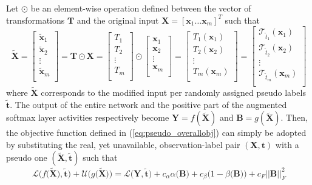 \documentclass{article} \usepackage{iclr2018_conference,times}
\begin{document}
Let $\odot$ be an element-wise operation defined between the vector of transformations $\boldsymbol{T}$ and the original input $\boldsymbol{X}=[\boldsymbol{x}_1 \dots \boldsymbol{x}_m]^T$ such that
\begin{equation}
\boldsymbol{\tilde{X}} = 
\begin{bmatrix}
\boldsymbol{\tilde{x}}_{1} \\ \boldsymbol{\tilde{x}}_{2} \\ \vdots \\ \boldsymbol{\tilde{x}}_m \\
\end{bmatrix} 
=
\boldsymbol{T} \odot \boldsymbol{X} = 
\begin{bmatrix}
T_{1} \\ T_{2} \\ \vdots \\ T_m \\
\end{bmatrix}
\odot
\begin{bmatrix}
\boldsymbol{x}_{1} \\ \boldsymbol{x}_{2} \\ \vdots \\ \boldsymbol{x}_m \\
\end{bmatrix} 
=
\begin{bmatrix}
T_{1}(\boldsymbol{x}_{1}) \\ T_{2}(\boldsymbol{x}_{2}) \\ \vdots \\ T_{m}(\boldsymbol{x}_m) \\
\end{bmatrix}
=
\begin{bmatrix}
\mathcal{T}_{\tilde{t}_1}(\boldsymbol{x}_{1}) \\ \mathcal{T}_{\tilde{t}_2}(\boldsymbol{x}_{2}) \\ \vdots \\ \mathcal{T}_{\tilde{t}_m}(\boldsymbol{x}_m) \\
\end{bmatrix} 
\end{equation}
where $\boldsymbol{\tilde{X}}$ corresponds to the modified input per randomly assigned pseudo labels $\boldsymbol{\tilde{t}}$. The output of the entire network and the positive part of the augmented softmax layer activities respectively become $\boldsymbol{Y} = f(\boldsymbol{\tilde{X}})$ and $\boldsymbol{B} = g(\boldsymbol{\tilde{X}})$. Then, the objective function defined in (\ref{eq:pseudo_overallobj}) can simply be adopted by substituting the real, yet unavailable, observation-label pair $(\boldsymbol{X}, \boldsymbol{t})$ with a pseudo one $(\boldsymbol{\tilde{X}}, \boldsymbol{\tilde{t}})$ such that 
\begin{equation}
\label{eq:pseudo_updateddobj}
\mathcal{L}\big(f\big(\boldsymbol{\tilde{X}}), \boldsymbol{\tilde{t}}\big) +
\mathcal{U}\big(g\big(\boldsymbol{\tilde{X}}\big)\big) =
\mathcal{L}\big(\boldsymbol{Y}, \boldsymbol{\tilde{t}}\big) + c_{\alpha}\alpha\big(\boldsymbol{B}\big) + c_{\beta}\big(1-\beta\big(\boldsymbol{B}\big)\big) + c_F||\boldsymbol{B}||^2_F
\end{equation}
\end{document}
